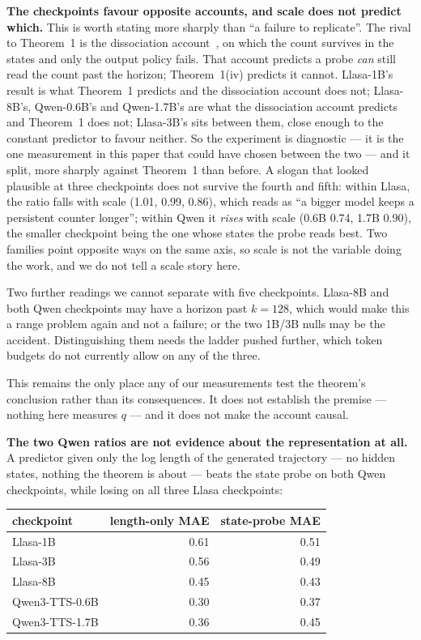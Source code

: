 \documentclass[11pt]{article}
\begin{document}
\noindent\textbf{The checkpoints favour opposite accounts, and scale does not
predict which.} This is worth stating more sharply than ``a failure to
replicate''. The rival to Theorem~1 is the dissociation
account~\cite{venkatesh2026repeated}, on which the count survives in the states
and only the output policy fails. That account predicts a probe \emph{can} still
read the count past the horizon; Theorem~1(iv) predicts it cannot. Llasa-1B's
result is what Theorem~1 predicts and the dissociation account does not;
Llasa-8B's, Qwen-0.6B's and Qwen-1.7B's are what the dissociation account
predicts and Theorem~1 does not; Llasa-3B's sits between them, close enough to
the constant predictor to favour neither. So the experiment is diagnostic --- it
is the one measurement in this paper that could have chosen between the two ---
and it split, more sharply against Theorem~1 than before. A slogan that looked
plausible at three checkpoints does not survive the fourth and fifth: within
Llasa, the ratio falls with scale (1.01, 0.99, 0.86), which reads as ``a bigger
model keeps a persistent counter longer''; within Qwen it \emph{rises} with scale
(0.6B 0.74, 1.7B 0.90), the smaller checkpoint being the one whose states the
probe reads best. Two families point opposite ways on the same axis, so scale is
not the variable doing the work, and we do not tell a scale story here.

Two further readings we cannot separate with five checkpoints. Llasa-8B and both
Qwen checkpoints may have a horizon past $k=128$, which would make this a range
problem again and not a failure; or the two 1B/3B nulls may be the accident.
Distinguishing them needs the ladder pushed further, which token budgets do not
currently allow on any of the three.

This remains the only place any of our measurements test the theorem's conclusion
rather than its consequences. It does not establish the premise --- nothing here
measures $q$ --- and it does not make the account causal.

\noindent\textbf{The two Qwen ratios are not evidence about the representation at
all.} A predictor given only the log length of the generated trajectory --- no
hidden states, nothing the theorem is about --- beats the state probe on both
Qwen checkpoints, while losing on all three Llasa checkpoints:

\begin{center}
\begin{tabular}{lrr}
\toprule
checkpoint & length-only MAE & state-probe MAE \\
\midrule
Llasa-1B       & 0.61 & 0.51 \\
Llasa-3B       & 0.56 & 0.49 \\
Llasa-8B       & 0.45 & 0.43 \\
Qwen3-TTS-0.6B & 0.30 & 0.37 \\
Qwen3-TTS-1.7B & 0.36 & 0.45 \\
\bottomrule
\end{tabular}
\end{center}
\end{document}

